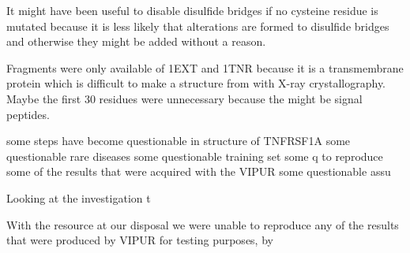 It might have been useful to disable disulfide bridges if no cysteine residue is mutated because it is less likely that alterations are formed to disulfide bridges and otherwise they might be added without a reason.

Fragments were only available of 1EXT and 1TNR because it is a transmembrane protein which is difficult to make a structure from with X-ray crystallography.
Maybe the first 30 residues were unnecessary because the might be signal peptides. 


 some steps have become questionable in structure of TNFRSF1A some questionable  rare diseases  some questionable  training set some q to reproduce some of the results that were acquired with the VIPUR some questionable assu


Looking at the investigation t

With the resource at our disposal we were unable to reproduce any of the results that were produced by VIPUR for testing purposes, by 